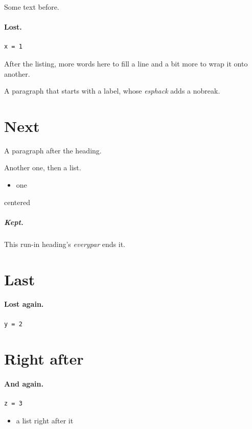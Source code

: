 \documentclass{article}
\begin{document}
Some text before.

\paragraph{Lost.}
\begin{lstlisting}[caption={A caption},label=lst:a]
x = 1
\end{lstlisting}
After the listing, more words here to fill a line and a bit more to wrap it onto another.

\label{p:a}A paragraph that starts with a label, whose \textit{esphack} adds a nobreak.

\section{Next}
A paragraph after the heading.

Another one, then a list.
\begin{itemize}
\item one
\end{itemize}

\begin{center}
centered
\end{center}

\subparagraph{Kept.} This run-in heading's \textit{everypar} ends it.

\section{Last}
\paragraph{Lost again.}
\begin{lstlisting}
y = 2
\end{lstlisting}
\section{Right after}
\paragraph{And again.}
\begin{lstlisting}
z = 3
\end{lstlisting}
\begin{itemize}
\item a list right after it
\end{itemize}
\end{document}
